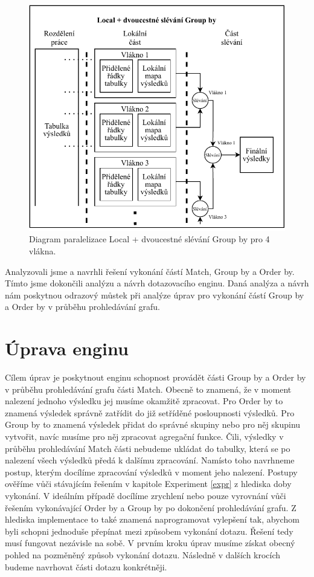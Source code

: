 \clearpage
\begin{figure}[!htp]
\includegraphics{../img/diaLocalGr.pdf}\centering
\caption{Diagram paralelizace Local + dvoucestné slévání Group by pro 4 vlákna.}
\label{figure.diaLocalGr}
\end{figure}

\bigskip
Analyzovali jsme a navrhli řešení vykonání částí Match, Group by a Order by.
Tímto jsme dokončili analýzu a návrh dotazovacího enginu.
Daná analýza a návrh nám poskytnou odrazový můstek při analýze úprav pro vykonání částí Group by a Order by v průběhu prohledávání grafu.


\section{Úprava enginu} \label{anal.improvement}

Cílem úprav je poskytnout enginu schopnost provádět části Group by a Order by v průběhu prohledávání grafu části Match.
Obecně to znamená, že v moment nalezení jednoho výsledku jej musíme okamžitě zpracovat.
Pro Order by to znamená výsledek správně zatřídit do již setříděné posloupnosti výsledků.
Pro Group by to znamená výsledek přidat do správné skupiny nebo pro něj skupinu vytvořit, navíc musíme pro něj zpracovat agregační funkce. 
Čili, výsledky v průběhu prohledávání Match části nebudeme ukládat do tabulky, která se po nalezení všech výsledků předá k dalšímu zpracování.
Namísto toho navrhneme postup, kterým docílíme zpracování výsledků v moment jeho nalezení.
Postupy ověříme vůči stávajícím řešením v kapitole Experiment \ref{expr} z hlediska doby vykonání.
V ideálním případě docílíme zrychlení nebo pouze vyrovnání vůči řešením vykonávající Order by a Group by po dokončení prohledávání grafu.
Z hlediska implementace to také znamená naprogramovat vylepšení tak, abychom byli schopni jednoduše přepínat mezi způsobem vykonání dotazu.
Řešení tedy musí fungovat nezávisle na sobě. 
V prvním kroku úprav musíme získat obecný pohled na pozměněný způsob vykonání dotazu.
Následně v dalších krocích budeme navrhovat části dotazu konkrétněji.

